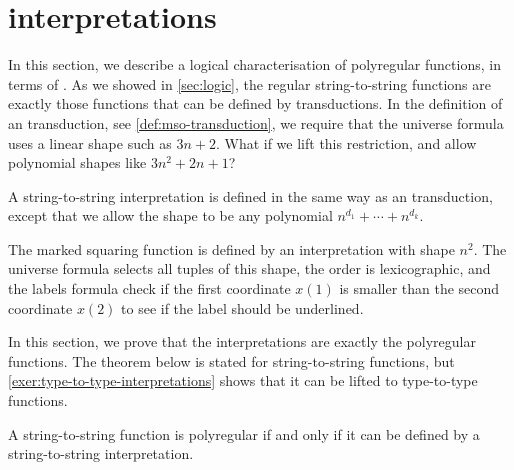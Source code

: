 \section{\mso interpretations}
\label{sec:mso-interpretation}


In this section, we describe a logical characterisation of polyregular functions, in terms of \mso.
As we showed in \cref{sec:logic}, the regular string-to-string functions are exactly those functions that can be defined by \mso transductions. In the definition of  an \mso transduction, see \cref{def:mso-transduction}, we require that the universe formula uses a linear shape such as $3n + 2$.  What if we lift this restriction, and allow polynomial shapes like $3n^2 + 2n + 1$?


\begin{definition} \label{def:mso-interpretation}
    A string-to-string \mso interpretation is defined in the same way as an \mso transduction, except that we allow the shape to be any polynomial $n^{d_1} + \cdots + n^{d_k}$.
\end{definition}


\begin{myexample}\label{ex:marked-squaring-mso-interpretation}
    The marked squaring function is defined by an \mso interpretation with shape $n^2$. The universe formula selects all tuples of this shape, the order is lexicographic, and the labels formula check if the first coordinate $x(1)$ is smaller than the second coordinate $x(2)$ to see if the label should be underlined.
\end{myexample}

In this section, we prove that the \mso interpretations are exactly the polyregular functions.  The theorem below is stated for string-to-string functions, but \cref{exer:type-to-type-interpretations} shows that it can be lifted to type-to-type functions.
\begin{theorem}\label{thm:mso-interpretation}
A string-to-string function is polyregular if and only if it can be defined by a string-to-string \mso interpretation.
\end{theorem}

